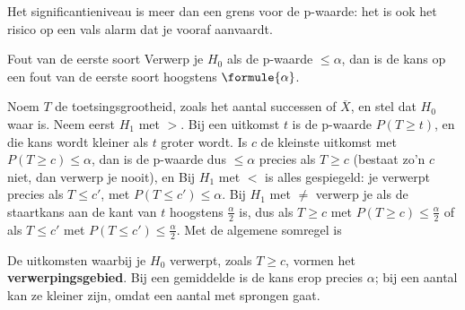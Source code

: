 Het significantieniveau is meer dan een grens voor de p-waarde: het is ook het risico op een vals alarm dat je vooraf aanvaardt.

\begin{theorie}
\begin{stelling}{Fout van de eerste soort}
Verwerp je $H_0$ als de p-waarde $\leqslant \alpha$, dan is de kans op een fout van de eerste soort hoogstens $\formule{\alpha}$.
\end{stelling}

\begin{bewijs}
Noem $T$ de toetsingsgrootheid, zoals het aantal successen of $\overline{X}$, en stel dat $H_0$ waar is. Neem eerst $H_1$ met $>$. Bij een uitkomst $t$ is de p-waarde $P(T \geqslant t)$, en die kans wordt kleiner als $t$ groter wordt. Is $c$ de kleinste uitkomst met $P(T \geqslant c) \leqslant \alpha$, dan is de p-waarde dus $\leqslant \alpha$ precies als $T \geqslant c$ (bestaat zo'n $c$ niet, dan verwerp je nooit), en
Bij $H_1$ met $<$ is alles gespiegeld: je verwerpt precies als $T \leqslant c'$, met $P(T \leqslant c') \leqslant \alpha$. Bij $H_1$ met $\neq$ verwerp je als de staartkans aan de kant van $t$ hoogstens $\frac{\alpha}{2}$ is, dus als $T \geqslant c$ met $P(T \geqslant c) \leqslant \frac{\alpha}{2}$ of als $T \leqslant c'$ met $P(T \leqslant c') \leqslant \frac{\alpha}{2}$. Met de algemene somregel is
\end{bewijs}
\end{theorie}

De uitkomsten waarbij je $H_0$ verwerpt, zoals $T \geqslant c$, vormen het \textbf{verwerpingsgebied}. Bij een gemiddelde is de kans erop precies $\alpha$; bij een aantal kan ze kleiner zijn, omdat een aantal met sprongen gaat.


